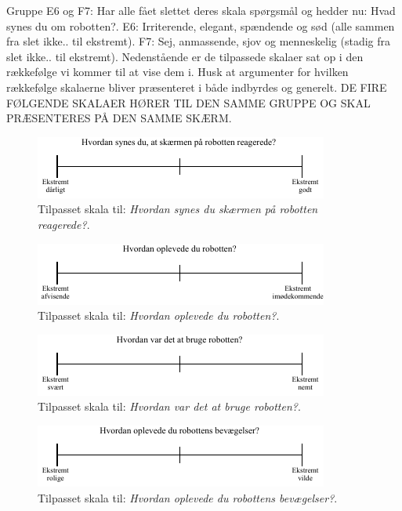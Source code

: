 %
Gruppe E6 og F7: Har alle fået slettet deres skala spørgsmål og hedder nu: Hvad synes du om robotten?. E6: Irriterende, elegant, spændende og sød (alle sammen fra slet ikke.. til ekstremt). F7: Sej, anmassende, sjov og menneskelig (stadig fra slet ikke.. til ekstremt). \blankline
%
Nedenstående er de tilpassede skalaer sat op i den rækkefølge vi kommer til at vise dem i. Husk at argumenter for hvilken rækkefølge skalaerne bliver præsenteret i både indbyrdes og generelt. \blankline
%
DE FIRE FØLGENDE SKALAER HØRER TIL DEN SAMME GRUPPE OG SKAL PRÆSENTERES PÅ DEN SAMME SKÆRM.
%
\begin{figure}[H]
\centering
\includegraphics[width =\textwidth]{Figure/TilpasningAfSkalaer/TilpassetSkaermensReaktion} 
\caption{Tilpasset skala til: \textit{Hvordan synes du skærmen på robotten reagerede?}.}
\label{fig:TilpasningSkaermensReaktion}
\end{figure}
\noindent
%
%
\begin{figure}[H]
\centering
\includegraphics[width =\textwidth]{Figure/TilpasningAfSkalaer/TilpassetOplevede} 
\caption{Tilpasset skala til: \textit{Hvordan oplevede du robotten?}.}
\label{fig:TilpasningOplevede}
\end{figure}
\noindent
%
%
\begin{figure}[H]
\centering
\includegraphics[width =\textwidth]{Figure/TilpasningAfSkalaer/TilpassetHvordanVarDetAtBrugeR} 
\caption{Tilpasset skala til: \textit{Hvordan var det at bruge robotten?}.}
\label{fig:TilpasningBrugAfR}
\end{figure}
\noindent
%
%
\begin{figure}[H]
\centering
\includegraphics[width =\textwidth]{Figure/TilpasningAfSkalaer/TilpassetBevaegelserR} 
\caption{Tilpasset skala til: \textit{Hvordan oplevede du robottens bevægelser?}.}
\label{fig:TilpasningBevaegelserR}
\end{figure}
